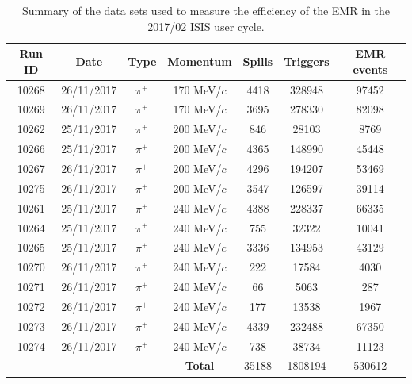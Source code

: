 \begin{table}[htb!]
	\centering
	\begin{tabular}{c|c|c|c|c|c|c}
		Run ID & Date & Type & Momentum & Spills & Triggers & EMR events \\
		\hline
		10268 & 26/11/2017 & $\pi^+$ & 170 MeV/$c$ & 4418 & 328948 & 97452 \\
		10269 & 26/11/2017 & $\pi^+$ & 170 MeV/$c$ & 3695 & 278330 & 82098 \\
		\hline
		10262 & 25/11/2017 & $\pi^+$ & 200 MeV/$c$ & 846 & 28103 & 8769 \\
		10266 & 25/11/2017 & $\pi^+$ & 200 MeV/$c$ & 4365 & 148990 & 45448 \\
		10267 & 26/11/2017 & $\pi^+$ & 200 MeV/$c$ & 4296 & 194207 & 53469 \\
		10275 & 26/11/2017 & $\pi^+$ & 200 MeV/$c$ & 3547 & 126597 & 39114 \\
		\hline
		10261 & 25/11/2017 & $\pi^+$ & 240 MeV/$c$ & 4388 & 228337 & 66335 \\
		10264 & 25/11/2017 & $\pi^+$ & 240 MeV/$c$ & 755 & 32322 & 10041 \\
		10265 & 25/11/2017 & $\pi^+$ & 240 MeV/$c$ & 3336 & 134953 & 43129 \\
		10270 & 26/11/2017 & $\pi^+$ & 240 MeV/$c$ & 222 & 17584 & 4030 \\
		10271 & 26/11/2017 & $\pi^+$ & 240 MeV/$c$ & 66 & 5063 & 287 \\
		10272 & 26/11/2017 & $\pi^+$ & 240 MeV/$c$ & 177 & 13538 & 1967 \\
		10273 & 26/11/2017 & $\pi^+$ & 240 MeV/$c$ & 4339 & 232488 & 67350 \\
		10274 & 26/11/2017 & $\pi^+$ & 240 MeV/$c$ & 738 & 38734 & 11123 \\
		\hline
		\multicolumn{3}{c}{} & \textbf{Total} & 35188 & 1808194 & 530612
	\end{tabular}
	\caption{Summary of the data sets used to measure the efficiency of the EMR in the 2017/02 ISIS user cycle.}
	\label{tab:emr_analysis_data_sets}
\end{table}

